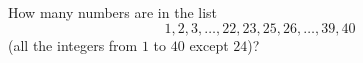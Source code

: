 How many numbers are in the list
\[1,2,3,\dots,22,23,25,26,\dots,39,40\]
(all the integers from $1$ to $40$ except $24$)?
